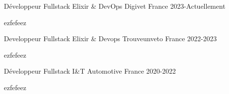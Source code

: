 
\begin{cventries}

  \cventry
    {Développeur Fullstack Elixir \& DevOps}
    {Digivet}
    {France}
    {2023-Actuellement}
    {
      \begin{cvitems}
        \item {ezfefeez}
      \end{cvitems}
    }

  \cventry
    {Developpeur Fullstack Elixir \& Devops}
    {Trouveunveto}
    {France}
    {2022-2023}
    {
      \begin{cvitems}
        \item{ezfefeez}
      \end{cvitems}
    }

  \cventry
    {Développeur Fullstack}
    {I\&T Automotive}
    {France}
    {2020-2022}
    {
      \begin{cvitems}
        \item{ezfefeez}
      \end{cvitems}
    }

\end{cventries}
